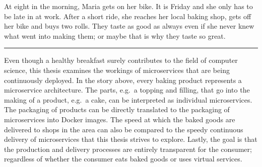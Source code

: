 At eight in the morning, Maria gets on her bike. It is Friday and she only has
to be late in at work. After a short ride, she reaches her local baking shop,
gets off her bike and buys two rolls. They taste as good as always even if she
never knew what went into making them; or maybe that is why they taste so
great.

\rule{2cm}{0.4pt}

Even though a healthy breakfast surely contributes to the field of computer
science, this thesis examines the workings of microservices that are being
continuously deployed. In the story above, every baking product represents a
microservice architecture. The parts, e.g.\ a topping and filling, that go into
the making of a product, e.g.\ a cake, can be interpreted as individual
microservices. The packaging of products can be directly translated to the
packaging of microservices into Docker images. The speed at which the baked
goods are delivered to shops in the area can also be compared to the speedy
continuous delivery of microservices that this thesis strives to explore.
Lastly, the goal is that the production and delivery processes are entirely
transparent for the consumer; regardless of whether the consumer eats baked
goods or uses virtual services.
